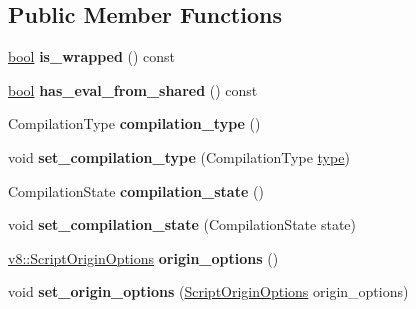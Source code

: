 \subsection*{Public Member Functions}
\begin{DoxyCompactItemize}
\item 
\mbox{\label{classv8_1_1internal_1_1Script_a920084d74a906415a9429bf56c9aa405}} 
\mbox{\hyperlink{classbool}{bool}} {\bfseries is\+\_\+wrapped} () const
\item 
\mbox{\label{classv8_1_1internal_1_1Script_ad819f6a2ada0f89cdf23487c27851bad}} 
\mbox{\hyperlink{classbool}{bool}} {\bfseries has\+\_\+eval\+\_\+from\+\_\+shared} () const
\item 
\mbox{\label{classv8_1_1internal_1_1Script_ae3652d31a2782b16aab75be392caec97}} 
Compilation\+Type {\bfseries compilation\+\_\+type} ()
\item 
\mbox{\label{classv8_1_1internal_1_1Script_ac5c747e61ee61b21cb9b3b41fb8f7e37}} 
void {\bfseries set\+\_\+compilation\+\_\+type} (Compilation\+Type \mbox{\hyperlink{classstd_1_1conditional_1_1type}{type}})
\item 
\mbox{\label{classv8_1_1internal_1_1Script_a1d8598eca0b43c2f9982245eec7a5237}} 
Compilation\+State {\bfseries compilation\+\_\+state} ()
\item 
\mbox{\label{classv8_1_1internal_1_1Script_ad6da453b2b624bb195815bd5463d8d05}} 
void {\bfseries set\+\_\+compilation\+\_\+state} (Compilation\+State state)
\item 
\mbox{\label{classv8_1_1internal_1_1Script_ab2a81ccdc91d527e602b7dc0faf53d09}} 
\mbox{\hyperlink{classv8_1_1ScriptOriginOptions}{v8\+::\+Script\+Origin\+Options}} {\bfseries origin\+\_\+options} ()
\item 
\mbox{\label{classv8_1_1internal_1_1Script_a241b70909c7ece4d3beafc2a5b0acb1f}} 
void {\bfseries set\+\_\+origin\+\_\+options} (\mbox{\hyperlink{classv8_1_1ScriptOriginOptions}{Script\+Origin\+Options}} origin\+\_\+options)

\end{DoxyCompactItemize}
